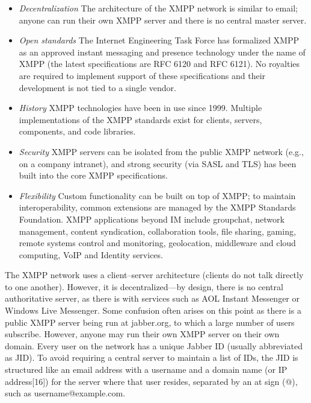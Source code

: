     \begin{itemize}
      \item \emph{Decentralization}
      \newline
      The architecture of the XMPP network is similar to email; anyone can run their own XMPP server and there is no central master server.
      \newline
      \item \emph{Open standards}
      \newline
      The Internet Engineering Task Force has formalized XMPP as an approved instant messaging and presence technology under the name of XMPP (the latest specifications are RFC 6120 and RFC 6121). No royalties are required to implement support of these specifications and their development is not tied to a single vendor.
      \newline
      \item \emph{History}
      \newline
      XMPP technologies have been in use since 1999. Multiple implementations of the XMPP standards exist for clients, servers, components, and code libraries.
      \newline
      \item \emph{Security}
      \newline
      XMPP servers can be isolated from the public XMPP network (e.g., on a company intranet), and strong security (via SASL and TLS) has been built into the core XMPP specifications.
      \newline
      \item \emph{Flexibility}
      \newline
      Custom functionality can be built on top of XMPP; to maintain interoperability, common extensions are managed by the XMPP Standards Foundation. XMPP applications beyond IM include groupchat, network management, content syndication, collaboration tools, file sharing, gaming, remote systems control and monitoring, geolocation, middleware and cloud computing, VoIP and Identity services.
      \end{itemize}
      The XMPP network uses a client–server architecture (clients do not talk directly to one another). However, it is decentralized—by design, there is no central authoritative server, as there is with services such as AOL Instant Messenger or Windows Live Messenger. Some confusion often arises on this point as there is a public XMPP server being run at jabber.org, to which a large number of users subscribe. However, anyone may run their own XMPP server on their own domain.
      Every user on the network has a unique Jabber ID (usually abbreviated as JID). To avoid requiring a central server to maintain a list of IDs, the JID is structured like an email address with a username and a domain name (or IP address[16]) for the server where that user resides, separated by an at sign (@), such as username@example.com.

